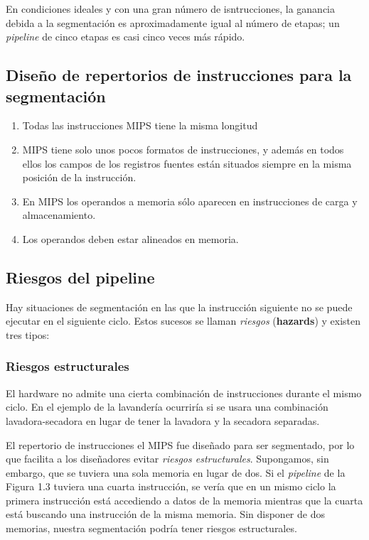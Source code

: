 \documentclass[12pt,a4paper]{report}
\begin{document}
			\par En condiciones ideales y con una gran número de isntrucciones, la ganancia debida a la segmentación es aproximadamente igual al número de etapas; un \textit{pipeline} de cinco etapas es casi cinco veces más rápido.

		\subsection{Diseño de repertorios de instrucciones para la segmentación}
			\begin{enumerate}
				\item Todas las instrucciones MIPS tiene la misma longitud
				\item MIPS tiene solo unos pocos formatos de instrucciones, y además en todos ellos los campos de los registros fuentes están situados siempre en la misma posición de la instrucción.
				\item En MIPS los operandos a memoria sólo aparecen en instrucciones de carga y almacenamiento.
				\item Los operandos deben estar alineados en memoria.
			\end{enumerate}

		\subsection{Riesgos del pipeline}
			\par Hay situaciones de segmentación en las que la instrucción siguiente no se puede ejecutar en el siguiente ciclo. Estos sucesos se llaman \textit{riesgos} (\textbf{hazards}) y existen tres tipos:

			\subsubsection{Riesgos estructurales}
				\par El hardware no admite una cierta combinación de instrucciones durante el mismo ciclo. En el ejemplo de la lavandería ocurriría si se usara una combinación lavadora-secadora en lugar de tener la lavadora y la secadora separadas.
				\par El repertorio de instrucciones el MIPS fue diseñado para ser segmentado,
	por lo que facilita a los diseñadores evitar \textit{riesgos estructurales}. Supongamos, sin embargo, que se tuviera una sola memoria en lugar de dos. Si el \textit{pipeline} de la Figura 1.3 tuviera una cuarta instrucción, se vería que en un mismo ciclo la primera instrucción está accediendo a datos de la memoria mientras que la cuarta está buscando una instrucción de la misma memoria. Sin disponer de dos memorias, nuestra segmentación podría tener riesgos estructurales.
\end{document}
